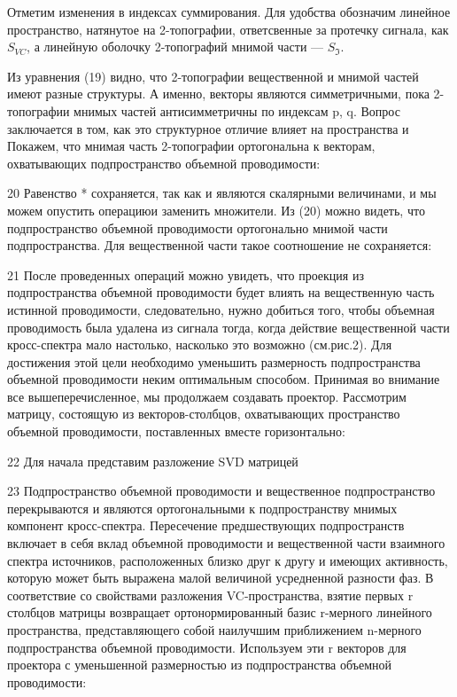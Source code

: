 Отметим изменения в индексах суммирования.
Для удобства обозначим линейное пространство, натянутое на 2-топографии, ответсвенные за протечку сигнала, как
$S_{VC}$, а линейную оболочку 2-топографий мнимой части --- $S_{\Im}$.

Из уравнения (19) видно, что 2-топографии вещественной и мнимой частей имеют разные структуры. А именно, векторы являются симметричными, пока 2-топографии мнимых частей антисимметричны по индексам p, q. Вопрос заключается в том, как это структурное отличие влияет на пространства и Покажем, что мнимая часть 2-топографии ортогональна к векторам, охватывающих подпространство объемной проводимости: 

20
Равенство * сохраняется, так как и являются скалярными величинами, и мы можем опустить операциюи заменить множители. Из (20) можно видеть, что подпространство объемной проводимости ортогонально мнимой части подпространства. Для вещественной части такое соотношение не сохраняется:

21
После проведенных операций можно увидеть, что проекция из подпространства объемной проводимости будет влиять на вещественную часть истинной проводимости, следовательно, нужно добиться того, чтобы объемная проводимость была удалена из сигнала тогда, когда действие вещественной части кросс-спектра мало настолько, насколько это возможно (см.рис.2). Для достижения этой цели необходимо уменьшить размерность подпространства объемной проводимости неким оптимальным способом.
Принимая во внимание все вышеперечисленное, мы продолжаем создавать проектор. Рассмотрим матрицу, состоящую из векторов-столбцов, охватывающих пространство объемной проводимости, поставленных вместе горизонтально:

22
Для начала представим разложение SVD матрицей 

23
Подпространство объемной проводимости и вещественное подпространство перекрываются и являются ортогональными к подпространству мнимых компонент кросс-спектра. Пересечение предшествующих подпространств включает в себя вклад объемной проводимости и вещественной части взаимного спектра источников, расположенных близко друг к другу и имеющих активность, которую может быть выражена малой величиной усредненной разности фаз. 
В соответствие со свойствами разложения VC-пространства, взятие первых r столбцов матрицы возвращает ортонормированный базис r-мерного линейного пространства, представляющего собой наилучшим приближением n-мерного подпространства объемной проводимости. Используем эти r векторов для проектора с уменьшенной размерностью из подпространства объемной проводимости:

